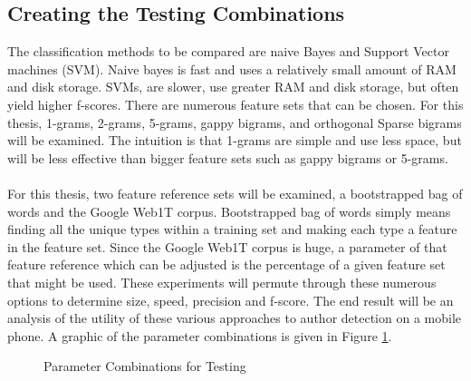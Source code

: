 	\subsection{Creating the Testing Combinations} The classification methods to be compared are naive Bayes and Support Vector machines (SVM). Naive bayes is fast and uses a relatively small amount of RAM and disk storage. SVMs, are slower, use greater RAM and disk storage, but often yield higher f-scores.  There are numerous feature sets that can be chosen.  For this thesis, 1-grams, 2-grams, 5-grams, gappy bigrams, and orthogonal Sparse bigrams will be examined.  The intuition is that 1-grams are simple and use less space, but will be less effective than bigger feature sets such as gappy bigrams or 5-grams.
	\paragraph{} For this thesis, two feature reference sets will be examined, a bootstrapped bag of words and the Google Web1T corpus.  Bootstrapped bag of words simply means finding all the unique types within a training set and making each type a feature in the feature set. Since the Google Web1T corpus is huge, a parameter of that feature reference which can be adjusted is the percentage of a given feature set that might be used.  These experiments will permute through these numerous options to determine size, speed, precision and f-score.  The end result will be an analysis of the utility of these various approaches to author detection on a mobile phone.  A graphic of the parameter combinations is given in Figure \ref{fig:parameterCombinations}.   
	
	\begin{figure}[ht!]
		\begin{center}
			\caption{Parameter Combinations for Testing}
			\label{fig:parameterCombinations}
		\end{center}
	\end{figure}
	
